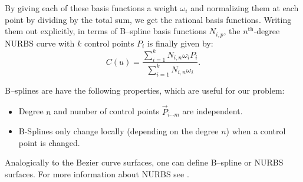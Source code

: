 By giving each of these basis functions a weight $\omega_i$ and normalizing them at each point by dividing by the total sum, we get the rational basis functions. Writing them out explicitly, in terms of B--spline basis functions $N_{i,p}$, the $n^{\text{th}}$-degree NURBS curve with $k$ control points $P_i$ is finally given by:
\begin{equation}
C(u) = \frac{\sum_{i=1}^{k}N_{i,n}\omega_{i}P_{i}}{\sum_{i=1}^{k}N_{i,n}\omega_{i}}.
\end{equation}

B--splines are have the following properties, which are useful for our problem:
\begin{itemize}
\item Degree $n$ and number of control points $\vec{P}_{i\cdots m}$ are independent.
\item B-Splines only change locally (depending on the degree $n$) when a control point is changed.
\end{itemize}

Analogically to the Bezier curve surfaces, one can define B--spline or NURBS surfaces. For more information about NURBS see \cite{farin1999nurbs}.